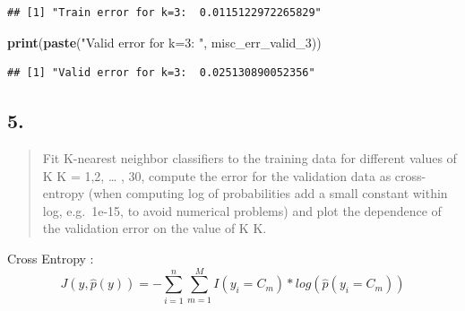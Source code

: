 \documentclass[
]{article}
\newenvironment{Shaded}{\begin{snugshade}}{\end{snugshade}}
\newcommand{\FunctionTok}[1]{\textcolor[rgb]{0.13,0.29,0.53}{\textbf{#1}}}
\newcommand{\NormalTok}[1]{#1}
\newcommand{\StringTok}[1]{\textcolor[rgb]{0.31,0.60,0.02}{#1}}
\begin{document}
\begin{verbatim}
## [1] "Train error for k=3:  0.0115122972265829"
\end{verbatim}

\begin{Shaded}
\begin{Highlighting}[]
\FunctionTok{print}\NormalTok{(}\FunctionTok{paste}\NormalTok{(}\StringTok{"Valid error for k=3: "}\NormalTok{, misc\_err\_valid\_3))}
\end{Highlighting}
\end{Shaded}

\begin{verbatim}
## [1] "Valid error for k=3:  0.025130890052356"
\end{verbatim}

\hypertarget{section-4}{%
\subsection{5.}\label{section-4}}

\begin{quote}
Fit K-nearest neighbor classifiers to the training data for different
values of K K = 1,2, \ldots{} , 30, compute the error for the validation
data as cross-entropy (when computing log of probabilities add a small
constant within log, e.g.~1e-15, to avoid numerical problems) and plot
the dependence of the validation error on the value of K K.
\end{quote}

Cross Entropy :
\[J(y,\hat{p}(y)) = -\sum_{i=1}^{n}\sum_{m=1}^{M}I(y_i=C_m)*log(\hat{p}(y_i=C_m))\]
\end{document}
